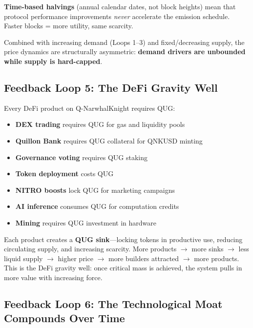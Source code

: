 \documentclass[11pt,a4paper]{article}
\begin{document}
\textbf{Time-based halvings} (annual calendar dates, not block heights) mean that protocol performance improvements \textit{never} accelerate the emission schedule. Faster blocks = more utility, same scarcity.

Combined with increasing demand (Loops 1--3) and fixed/decreasing supply, the price dynamics are structurally asymmetric: \textbf{demand drivers are unbounded while supply is hard-capped}.

\subsection{Feedback Loop 5: The DeFi Gravity Well}

Every DeFi product on Q-NarwhalKnight requires QUG:

\begin{itemize}[leftmargin=1.5em]
    \item \textbf{DEX trading} requires QUG for gas and liquidity pools
    \item \textbf{Quillon Bank} requires QUG collateral for QNKUSD minting
    \item \textbf{Governance voting} requires QUG staking
    \item \textbf{Token deployment} costs QUG
    \item \textbf{NITRO boosts} lock QUG for marketing campaigns
    \item \textbf{AI inference} consumes QUG for computation credits
    \item \textbf{Mining} requires QUG investment in hardware
\end{itemize}

Each product creates a \textbf{QUG sink}---locking tokens in productive use, reducing circulating supply, and increasing scarcity. More products $\to$ more sinks $\to$ less liquid supply $\to$ higher price $\to$ more builders attracted $\to$ more products. This is the DeFi gravity well: once critical mass is achieved, the system pulls in more value with increasing force.

\subsection{Feedback Loop 6: The Technological Moat Compounds Over Time}
\end{document}
